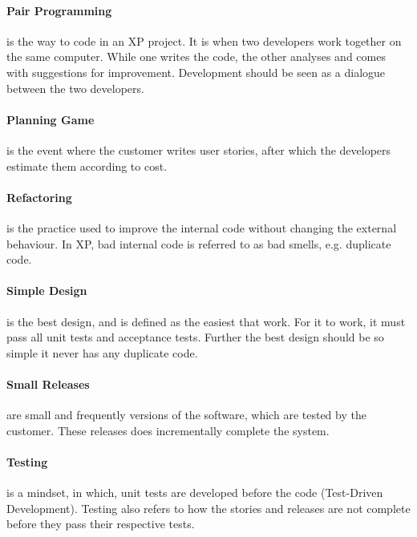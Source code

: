 \paragraph{Pair Programming} is the way to code in an XP project.
It is when two developers work together on the same computer.
While one writes the code, the other analyses and comes with suggestions for improvement.
Development should be seen as a dialogue between the two developers.

\paragraph{Planning Game} is the event where the customer writes user stories, after which the developers estimate them according to cost.

\paragraph{Refactoring} is the practice used to improve the internal code without changing the external behaviour.
In XP, bad internal code is referred to as bad smells, e.g. duplicate code.


\paragraph{Simple Design} is the best design, and is defined as the easiest that work.
For it to work, it must pass all unit tests and acceptance tests.
Further the best design should be so simple it never has any duplicate code.


\paragraph{Small Releases} are small and frequently versions of the software, which are tested by the customer.
These releases does incrementally complete the system.

\paragraph{Testing} is a mindset, in which, unit tests are developed before the code (Test-Driven Development).
Testing also refers to how the stories and releases are not complete before they pass their respective tests.


